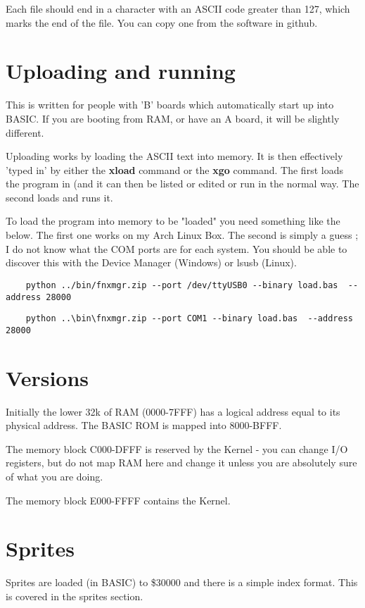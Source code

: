 Each file should end in a character with an ASCII code greater than 127, which marks the end of the file.  You can copy one from the software in github.

\section{Uploading and running}

This is written for people with 'B' boards which automatically start up into BASIC. If you are booting from RAM, or have an A board, it will be slightly different.

Uploading works by loading the ASCII text into memory. It is then effectively 'typed in' by either the \textbf{xload} command or the \textbf{xgo} command. The first loads the program in (and it can then be listed or edited or run in the normal way. The second loads and runs it.

To load the program into memory to be "loaded" you need something like the below. The first one works on my Arch Linux Box. The second is simply a guess ; I do not know what the COM ports are for each system. You should be able to discover this with the Device Manager (Windows) or lsusb (Linux).

\begin{verbatim}
	python ../bin/fnxmgr.zip --port /dev/ttyUSB0 --binary load.bas  --address 28000
\end{verbatim}

\begin{verbatim}
	python ..\bin\fnxmgr.zip --port COM1 --binary load.bas  --address 28000
\end{verbatim}

\section{Versions}

Initially the lower 32k of RAM (0000-7FFF) has a logical address equal to its physical address. The BASIC ROM is mapped into 8000-BFFF. 

The memory block C000-DFFF is reserved by the Kernel - you can change I/O registers, but do not map RAM here and change it unless you are absolutely sure of what you are doing.

The memory block E000-FFFF contains the Kernel.

\section{Sprites}
Sprites are loaded (in BASIC) to \$30000 and there is a simple index format. This is covered in the sprites section.
